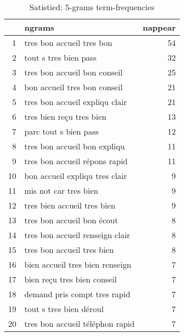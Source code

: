 \begin{table}[ht]
\centering
\begin{tabular}{rlr}
  \hline
 & ngrams & nappear \\ 
  \hline
1 & tres bon accueil tres bon &  54 \\ 
  2 & tout s tres bien pass &  32 \\ 
  3 & tres bon accueil bon conseil &  25 \\ 
  4 & bon accueil tres bon conseil &  21 \\ 
  5 & tres bon accueil expliqu clair &  21 \\ 
  6 & tres bien reçu tres bien &  13 \\ 
  7 & parc tout s bien pass &  12 \\ 
  8 & tres bon accueil bon expliqu &  11 \\ 
  9 & tres bon accueil répons rapid &  11 \\ 
  10 & bon accueil expliqu tres clair &   9 \\ 
  11 & mis not car tres bien &   9 \\ 
  12 & tres bien accueil tres bien &   9 \\ 
  13 & tres bon accueil bon écout &   8 \\ 
  14 & tres bon accueil renseign clair &   8 \\ 
  15 & tres bon accueil tres bien &   8 \\ 
  16 & bien accueil tres bien renseign &   7 \\ 
  17 & bien reçu tres bien conseil &   7 \\ 
  18 & demand pris compt tres rapid &   7 \\ 
  19 & tout s tres bien déroul &   7 \\ 
  20 & tres bon accueil téléphon rapid &   7 \\ 
   \hline
\end{tabular}
\caption{Satistied: 5-grams term-frequencies} 
\label{tab:tf_sup_5}
\end{table}
